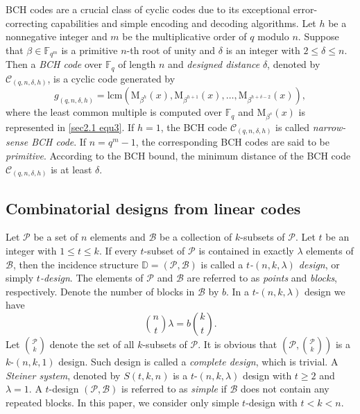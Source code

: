 \documentclass[sn-mathphys-num]{sn-jnl}%
\theoremstyle{thmstyleone}%
\theoremstyle{thmstyletwo}%
\theoremstyle{thmstylethree}%
\begin{document}
BCH codes are a crucial class of cyclic codes due to its exceptional error-correcting capabilities and simple encoding and decoding algorithms. Let $h$ be a nonnegative integer and $m$ be the multiplicative order of $q$ modulo $n$. Suppose that $\beta\in\mathbb{F}_{q^m}$ is a primitive $n$-th root of unity and $\delta$ is an integer with $2\le\delta\le n$. Then a \textit{BCH code} over $\mathbb{F}_q$ of length $n$ and \textit{designed distance} $\delta$, denoted by $\mathcal{C}_{(q,n,\delta,h)}$, is a cyclic code generated by 
\begin{equation*}
	g_{(q,n,\delta,h)}=\mathrm{lcm}\left(\mathrm{M}_{\beta^h}(x),\mathrm{M}_{\beta^{h+1}}(x),\dots,\mathrm{M}_{\beta^{h+\delta-2}}(x)\right),
\end{equation*}
where the least common multiple is computed over $\mathbb{F}_q$ and $\mathrm{M}_{\beta^s}(x)$ is represented in \cref{sec2.1 equ3}. If $h=1$, the BCH code $\mathcal{C}_{(q,n,\delta,h)}$ is called \textit{narrow-sense BCH code}. If $n=q^m-1$, the corresponding BCH codes are said to be \textit{primitive}.  According to the BCH bound, the minimum distance of the BCH code $\mathcal{C}_{(q,n,\delta,h)}$ is at least $\delta$.

\subsection{Combinatorial designs from linear codes}
Let $\mathcal{P}$ be a set of $n$ elements and $\mathcal{B}$ be a collection of $k$-subsets of $\mathcal{P}$. Let $t$ be an integer with $1\le t \le k$. If every $t$-subset of $\mathcal{P}$ is contained in exactly $\lambda$ elements of $\mathcal{B}$, then the incidence structure $\mathbb{D}=(\mathcal{P},\mathcal{B})$ is called a \textit{$t$-$(n,k,\lambda)$ design}, or simply \textit{$t$-design}. The elements of $\mathcal{P}$ and $\mathcal{B}$ are referred to as \textit{points} and \textit{blocks}, respectively. Denote the number of blocks in $\mathcal{B}$ by $b$. In a $t$-$(n,k,\lambda)$ design we have \cite[Chapter 4]{Ding2018DesignsLinearCodes}
\begin{equation}
	\label{sec1.2 equ1}
	\binom{n}{t}\lambda=b\binom{k}{t}.
\end{equation}
Let $\binom{\mathcal{P}}{k}$ denote the set of all $k$-subsets of $\mathcal{P}$. It is obvious that $(\mathcal{P},\binom{\mathcal{P}}{k})$ is a $k$-$(n,k,1)$ design. Such design is called a \textit{complete design}, which is trivial. A \textit{Steiner system}, denoted by $S(t,k,n)$ is a $t$-$(n,k,\lambda)$ design with $t\ge2$ and $\lambda=1$. A $t$-design $(\mathcal{P},\mathcal{B})$ is referred to as \textit{simple} if $\mathcal{B}$ does not contain any repeated blocks. In this paper, we consider only simple $t$-design with $t<k<n$.
\end{document}
